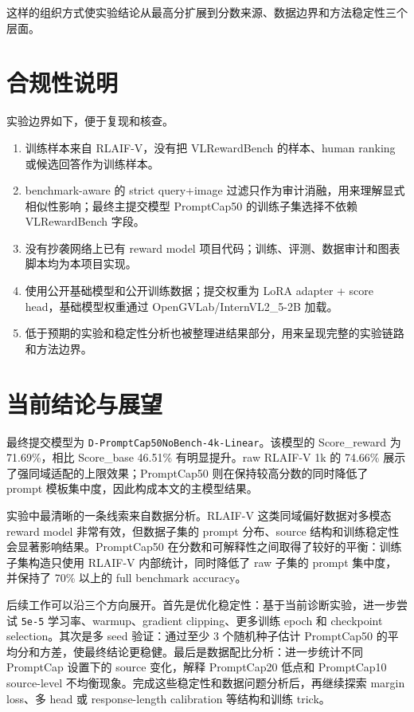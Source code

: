 \documentclass[11pt,a4paper]{ctexart}
\begin{document}
这样的组织方式使实验结论从最高分扩展到分数来源、数据边界和方法稳定性三个层面。

\section{合规性说明}

实验边界如下，便于复现和核查。

\begin{enumerate}
\item 训练样本来自 RLAIF-V，没有把 VLRewardBench 的样本、human ranking 或候选回答作为训练样本。
\item benchmark-aware 的 strict query+image 过滤只作为审计消融，用来理解显式相似性影响；最终主提交模型 PromptCap50 的训练子集选择不依赖 VLRewardBench 字段。
\item 没有抄袭网络上已有 reward model 项目代码；训练、评测、数据审计和图表脚本均为本项目实现。
\item 使用公开基础模型和公开训练数据；提交权重为 LoRA adapter + score head，基础模型权重通过 OpenGVLab/InternVL2\_5-2B 加载。
\item 低于预期的实验和稳定性分析也被整理进结果部分，用来呈现完整的实验链路和方法边界。
\end{enumerate}

\section{当前结论与展望}

最终提交模型为 \texttt{D-PromptCap50NoBench-4k-Linear}。该模型的 Score\_reward 为 71.69\%，相比 Score\_base 46.51\% 有明显提升。raw RLAIF-V 1k 的 74.66\% 展示了强同域适配的上限效果；PromptCap50 则在保持较高分数的同时降低了 prompt 模板集中度，因此构成本文的主模型结果。

实验中最清晰的一条线索来自数据分析。RLAIF-V 这类同域偏好数据对多模态 reward model 非常有效，但数据子集的 prompt 分布、source 结构和训练稳定性会显著影响结果。PromptCap50 在分数和可解释性之间取得了较好的平衡：训练子集构造只使用 RLAIF-V 内部统计，同时降低了 raw 子集的 prompt 集中度，并保持了 70\% 以上的 full benchmark accuracy。

后续工作可以沿三个方向展开。首先是优化稳定性：基于当前诊断实验，进一步尝试 \texttt{5e-5} 学习率、warmup、gradient clipping、更多训练 epoch 和 checkpoint selection。其次是多 seed 验证：通过至少 3 个随机种子估计 PromptCap50 的平均分和方差，使最终结论更稳健。最后是数据配比分析：进一步统计不同 PromptCap 设置下的 source 变化，解释 PromptCap20 低点和 PromptCap10 source-level 不均衡现象。完成这些稳定性和数据问题分析后，再继续探索 margin loss、多 head 或 response-length calibration 等结构和训练 trick。
\end{document}
